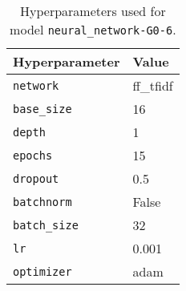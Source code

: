 \begin{table}[H]
\centering
\begin{tabularx}{0.48\textwidth}{|X|l|}
\hline
Hyperparameter & Value \\
\hline
\texttt{network} & ff\_tfidf \\
\texttt{base\_size} & 16 \\
\texttt{depth} & 1 \\
\texttt{epochs} & 15 \\
\texttt{dropout} & 0.5 \\
\texttt{batchnorm} & False \\
\texttt{batch\_size} & 32 \\
\texttt{lr} & 0.001 \\
\texttt{optimizer} & adam \\
\hline
\end{tabularx}
\caption{Hyperparameters used for model \texttt{neural\_network-G0-6}.}
\label{tab:hyperparameters_best_neural_network}

\end{table}
